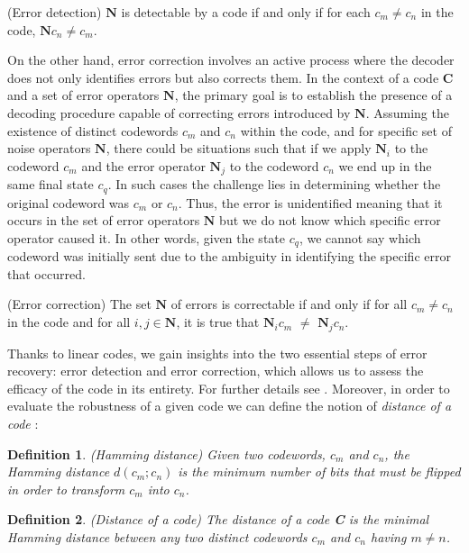 \documentclass{Configuration_Files/PoliMi3i_thesis}
\newtheorem{definition}{Definition}[chapter]
\begin{document}
\begin{theorem}(Error detection)
	$\textbf{N}$ is detectable by a code if and only if for each $c_m \neq c_n$ in the code, $\textbf{N}c_n \neq c_m $.
\end{theorem} 

On the other hand, error correction involves an active process where the decoder does not only identifies errors but also corrects them. 
In the context of a code $\textbf{C}$ and a set of error operators $\textbf{N}$, the primary goal is to establish the presence of a decoding procedure capable of correcting errors introduced by $\textbf{N}$. 
Assuming the existence of distinct codewords $c_m$ and $c_n$ within the code, and for specific set of noise operators $\textbf{N}$, there could be situations such that if we apply $\textbf{N}_i$ to the codeword $c_m$ and the error operator $\textbf{N}_j$ to the codeword $c_n$ we end up in the same final state $c_q$. In such cases the challenge lies in determining whether the original codeword was $c_m$ or $c_n$. Thus, the error is unidentified meaning that it occurs in the set of error operators $\textbf{N}$ but we do not know which specific error operator caused it. In other words, given the state $c_q$, we cannot say which codeword was initially sent due to the ambiguity in identifying the specific error that occurred.

\begin{theorem}(Error correction)
	The set $\textbf{N}$ of errors is correctable if and only if for all $c_m \neq c_n$ in the code and for all $i, j \in \textbf{N}$, it is true that $\textbf{N}_ic_m$ $\neq$ $\textbf{N}_jc_n$. 
\end{theorem} 

Thanks to linear codes, we gain insights into the two essential steps of error recovery: error detection and error correction, which allows us to assess the efficacy of the code in its entirety. For further details see \cite{Kas19}. Moreover, in order to evaluate the robustness of a given code we can define the notion of {\it distance of a code} :


\begin{definition}(Hamming distance)
	Given two codewords, $c_m$ and $c_n$, the Hamming distance $d(c_m; c_n)$ is the minimum number of bits that must be flipped in order to transform $c_m$ into $c_n$.
\end{definition}


\begin{definition}(Distance of a code)
	The distance of a code {\bf C } is the minimal Hamming distance between any two distinct codewords $c_m$ and $c_n$ having $m \neq n$.
\end{definition}
	
\end{document}
